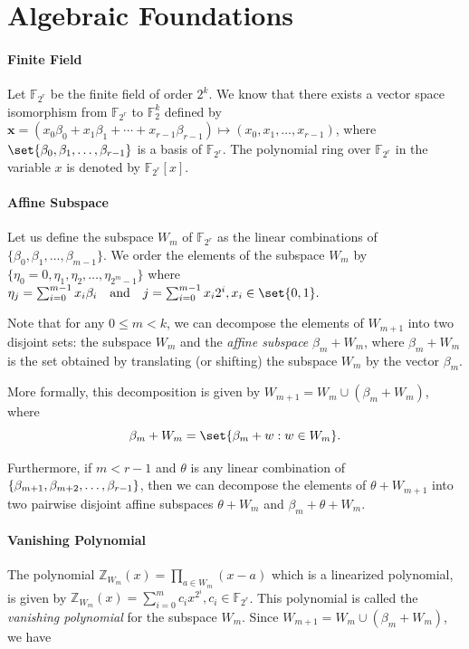 \documentclass[11pt,runningheads]{llncs}
\newcommand{\splitatcommas}[1]{%
	\begingroup
	\begingroup\lccode`~=`, \lowercase{\endgroup
		\edef~{\mathchar\the\mathcode`, \penalty0 \noexpand\hspace{0pt plus 1em}}%
	}\mathcode`,="8000 #1%
	\endgroup
}
\begin{document}
\section{Algebraic Foundations}\label{Sec:Preliminary}
\paragraph{Finite Field}
Let $\mathbb{F}_{2^r}$ be the finite field of order $2^k$. We know that there exists a vector space isomorphism from $\mathbb{F}_{2^r}$ to $\mathbb{F}_2^k$ defined by $\mathbf{x}=(x_0\beta_0+x_1\beta_1+ \cdots +x_{r-1}\beta_{r-1}) \mapsto (x_0,x_1, \ldots,x_{r-1})$, where $\set{\beta_0,\beta_1,\ldots,\beta_{r-1}}$ is a basis of $\mathbb{F}_{2^r}$. The polynomial ring over $\mathbb{F}_{2^r}$ in the variable $x$ is denoted by $\mathbb{F}_{2^r}[x]$.

\paragraph{Affine Subspace}
Let us define the subspace $W_m$ of $\mathbb{F}_{2^r}$ as the linear combinations of $\{\beta_0, \beta_1, \ldots, \beta_{m-1}\}$. We order the elements of the subspace $W_m$ by $\{\eta_0=0, \eta_1, \eta_2, \dots, \eta_{2^m-1}\}$ where
\(
    \eta_j = \sum_{i=0}^{m-1} x_i \beta_i \quad \text{and} \quad j=\sum_{i=0}^{m-1} x_i 2^i, x_i\in \set{0,1}.
\)

Note that for any $0 \leq m < k$, we can decompose the elements of $W_{m+1}$ into two disjoint sets: the subspace $W_m$ and the \textit{affine subspace} $\beta_m + W_m$, where $\beta_m + W_m$ is the set obtained by translating (or shifting) the subspace $W_m$ by the vector $\beta_m$.

More formally, this decomposition is given by $W_{m+1} = W_m \cup (\beta_m + W_m)$, where \[\beta_m + W_m = \set{\beta_m + w: w \in W_m} .\]

Furthermore, if $m < r-1$ and $\theta$ is any linear combination of $\{\splitatcommas{\beta_{m+1}, \beta_{m+2}, \ldots, \beta_{r-1}}\}$, then we can decompose the elements of $\theta + W_{m+1}$ into two pairwise disjoint affine subspaces $\theta + W_m$ and $\beta_{m} + \theta + W_m$.

\paragraph{Vanishing Polynomial}
The polynomial $\mathbb{Z}_{W_{m}}(x)= \prod_{a\in W_m}^{} (x-a)$ which is a linearized polynomial, is given by $\mathbb{Z}_{W_{m}}(x) = \sum_{i=0}^{m} c_i x^{2^i}, c_i \in \mathbb{F}_{2^r}$. This polynomial is called the \textit{vanishing polynomial} for the subspace $W_m$. Since $W_{m+1}= W_m \cup (\beta_{m}+W_m)$, we have
\end{document}
